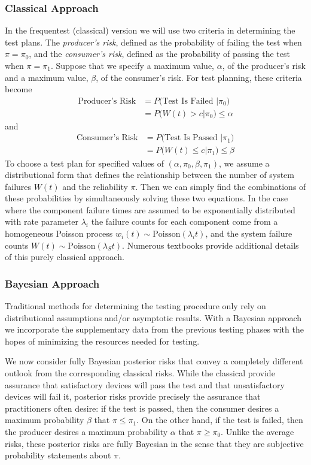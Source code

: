 \documentclass[12pt]{article}
\begin{document}
\subsubsection{Classical Approach}
In the frequentest (classical) version we will use two criteria in determining
the test plans. The \emph{producer's risk}, defined as the probability of
failing the test when $\pi = \pi_0$, and the \emph{consumer's risk}, defined as
the probability of passing the test when $\pi = \pi_1$.  Suppose that we specify
a maximum value, $\alpha$, of the producer's risk and a maximum value, $\beta$,
of the consumer's risk. For test planning, these criteria become
$$
\begin{aligned}
	\text{Producer's Risk} &= P \text{(Test Is Failed } \vert \pi_0 \text{)} \\ &=
	P \text{(} W(t) > c \vert \pi_0 \text{)} \leq \alpha
\end{aligned}
$$
and
$$
\begin{aligned}
	\text{Consumer's Risk} &= P \text{(Test Is Passed } \vert \pi_1 \text{)} \\ &=
	P \text{(} W(t) \leq c \vert \pi_1 \text{)} \leq \beta
\end{aligned}
$$
To choose a test plan for specified values of $(\alpha, \pi_0, \beta, \pi_1)$,
we assume a distributional form that defines the relationship between the number
of system failures $W(t)$ and the reliability $\pi$.  Then we can simply find
the combinations of these probabilities by simultaneously solving these two
equations.  In the case where the component failure times are assumed to be
exponentially distributed with rate parameter $\lambda_i$ the failure counts for
each component come from a homogeneous Poisson process $w_i(t) \sim
\text{Poisson}(\lambda_i t)$, and the system failure counts $W(t) \sim
\text{Poisson}(\lambda_S t)$.  Numerous textbooks provide additional details of
this purely classical approach.

\subsubsection{Bayesian Approach}
Traditional methods for determining the testing procedure only rely on
distributional assumptions and/or asymptotic results. With a Bayesian approach we
incorporate the supplementary data from the previous testing phases with the
hopes of minimizing the resources needed for testing.

We now consider fully Bayesian posterior risks that convey a completely
different outlook from the corresponding classical risks. While the classical
provide assurance that satisfactory devices will pass the test and that
unsatisfactory devices will fail it, posterior risks provide precisely the
assurance that practitioners often desire: if the test is passed, then the
consumer desires a maximum probability $\beta$ that $\pi \leq \pi_1$. On the
other hand, if the test is failed, then the producer desires a maximum
probability $\alpha$ that $\pi \geq \pi_0$. Unlike the average risks, these
posterior risks are fully Bayesian in the sense that they are subjective
probability statements about $\pi$.
\end{document}
